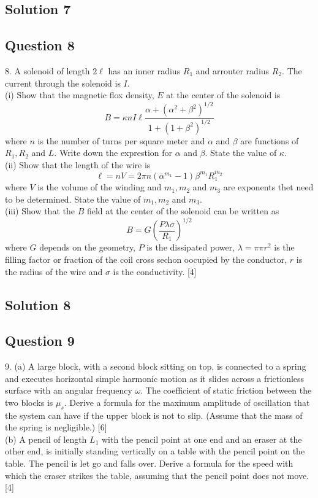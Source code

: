 \documentclass{article}
\begin{document}
\subsection{Solution 7}

\subsection{Question 8}

8. A solenoid of length $2 \ell$ has an inner radius $R_{1}$ and arrouter radius $R_{2}$. The current through the solenoid is $I$. \\
(i) Show that the magnetic flox density, $E$ at the center of the solenoid is
$$
B=\kappa n I \ell \frac{\alpha+\left(\alpha^{2}+\beta^{2}\right)^{1 / 2}}{1+\left(1+\beta^{2}\right)^{1 / 2}}
$$
where $n$ is the number of turns per square meter and $\alpha$ and $\beta$ are functions of $R_{1}, R_{2}$ and $L$. Write down the exprestion for $\alpha$ and $\beta$. State the value of $\kappa$. \\
(ii) Show that the length of the wire is
$$
\ell=n V=2 \pi n\left(\alpha^{m_{1}}-1\right) \beta^{m_{1}} R_{1}^{m_{2}}
$$
where $V$ is the volume of the winding and $m_{1}, m_{2}$ and $m_{3}$ are exponents thet need to be determined. State the value of $m_{1}, m_{2}$ and $m_{3}$. \\
(iii) Show that the $B$ field at the center of the solenoid can be written as
$$
B=G\left(\frac{P \lambda \sigma}{R_{1}}\right)^{1 / 2}
$$
where $G$ depends on the geometry, $P$ is the dissipated power, $\lambda=\pi \pi r^{2}$ is the filling factor or fraction of the coil cross sechon oocupied by the conductor, $r$ is the radius of the wire and $\sigma$ is the conductivity. [4]

\subsection{Solution 8}

\subsection{Question 9}
9. (a) A large block, with a second block sitting on top, is connected to a spring and executes horizontal simple harmonic motion as it slides across a frictionless surface with an angular frequency $\omega$. The coefficient of static friction between the two blocks is $\mu_{s}$. Derive a formula for the maximum amplitude of oscillation that the system can have if the upper block is not to slip. (Assume that the mass of the spring is negligible.) [6] \\
(b) A pencil of length $L_{1}$ with the pencil point at one end and an eraser at the other end, is initially standing vertically on a table with the pencil point on the table. The pencil is let go and falls over. Derive a formula for the speed with which the craser strikes the table, assuming that the pencil point does not move. [4]
\end{document}
